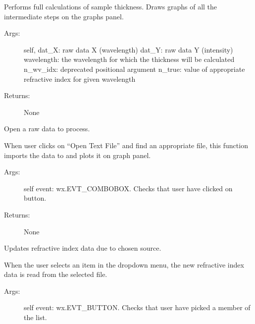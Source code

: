 \documentclass[letterpaper,10pt,english]{sphinxmanual}
\begin{document}
\begin{fulllineitems}
\begin{fulllineitems}
Performs full calculations of sample thickness. Draws graphs of all the 
intermediate steps on the graphs panel.
\begin{description}
\item[{Args:}] \leavevmode
self,
dat\_X: raw data X (wavelength)
dat\_Y: raw data Y (intensity)
wavelength: the wavelength for which the thickness will be calculated
n\_wv\_idx: deprecated positional argument
n\_true: value of appropriate refractive index for given wavelength

\item[{Returns:}] \leavevmode
None

\end{description}

\end{fulllineitems}


\begin{fulllineitems}
\label{\detokenize{GUI:GUI.MyPanel.on_open}}
Open a raw data to process.

When user clicks on “Open Text File” and find an appropriate file, 
this function imports the data to  and plots it on graph
panel.
\begin{description}
\item[{Args:}] \leavevmode
self
event: wx.EVT\_COMBOBOX. Checks that user have clicked on button.

\item[{Returns:}] \leavevmode
None

\end{description}

\end{fulllineitems}


\begin{fulllineitems}
\label{\detokenize{GUI:GUI.MyPanel.on_select}}
Updates refractive index data due to chosen source.

When the user selects an item in the drop\sphinxhyphen{}down menu, the new refractive index data is read from the selected file.
\begin{description}
\item[{Args:}] \leavevmode
self
event: wx.EVT\_BUTTON. Checks that user have picked a member of the list.


\end{description}
\end{fulllineitems}
\end{fulllineitems}
\end{document}
